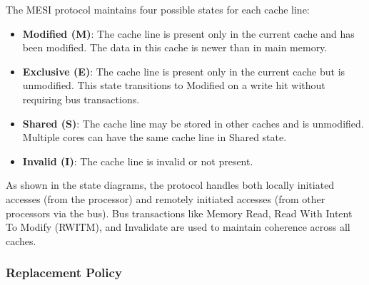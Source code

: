 \documentclass[12pt,a4paper]{article}
\begin{document}
The MESI protocol maintains four possible states for each cache line:
\begin{itemize}
    \item \textbf{Modified (M)}: The cache line is present only in the current cache and has been modified. The data in this cache is newer than in main memory.
    \item \textbf{Exclusive (E)}: The cache line is present only in the current cache but is unmodified. This state transitions to Modified on a write hit without requiring bus transactions.
    \item \textbf{Shared (S)}: The cache line may be stored in other caches and is unmodified. Multiple cores can have the same cache line in Shared state.
    \item \textbf{Invalid (I)}: The cache line is invalid or not present.
\end{itemize}

As shown in the state diagrams, the protocol handles both locally initiated accesses (from the processor) and remotely initiated accesses (from other processors via the bus). Bus transactions like Memory Read, Read With Intent To Modify (RWITM), and Invalidate are used to maintain coherence across all caches.



\subsubsection{Replacement Policy}
\end{document}
